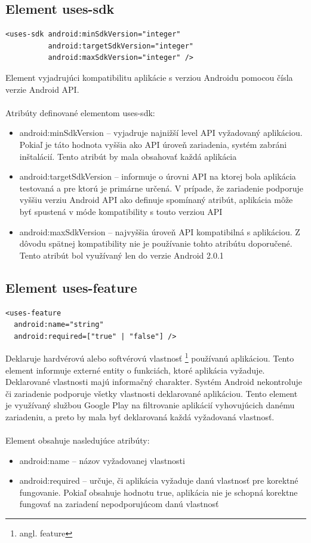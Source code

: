 \subsection{Element uses-sdk}
\lstset{language=XML}
\begin{lstlisting}
<uses-sdk android:minSdkVersion="integer"
          android:targetSdkVersion="integer"
          android:maxSdkVersion="integer" />
\end{lstlisting}
Element vyjadrujúci kompatibilitu aplikácie s verziou Androidu pomocou čísla verzie Android API.\\\\
Atribúty definované elementom uses-sdk:\\
\begin{itemize}
\item android:minSdkVersion – vyjadruje najnižší level API vyžadovaný aplikáciou. Pokiaľ je táto hodnota vyššia ako API úroveň zariadenia, systém zabráni inštalácií. Tento atribút by mala obsahovať každá aplikácia
\item android:targetSdkVersion – informuje o úrovni API na ktorej bola aplikácia testovaná a pre ktorú je primárne určená. V prípade, že zariadenie podporuje vyššiu verziu Android API ako definuje spomínaný atribút, aplikácia môže byť spustená v móde kompatibility s touto verziou API 
\item android:maxSdkVersion – najvyššia úroveň API kompatibilná s aplikáciou. Z dôvodu spätnej kompatibility nie je používanie tohto atribútu doporučené. Tento atribút bol využívaný len do verzie Android 2.0.1
\end{itemize}

\subsection{Element uses-feature}
\label{el_uses-feature}
\lstset{language=XML}
\begin{lstlisting}
<uses-feature
  android:name="string"
  android:required=["true" | "false"] />
\end{lstlisting}
Deklaruje hardvérovú alebo softvérovú vlastnosť \footnote{angl. feature} používanú aplikáciou. Tento element informuje externé entity o funkciách, ktoré aplikácia vyžaduje. Deklarované vlastnosti majú informačný charakter. Systém Android nekontroluje či zariadenie podporuje všetky vlastnosti deklarované aplikáciou. Tento element je využívaný službou Google Play na  filtrovanie aplikácií vyhovujúcich danému zariadeniu, a preto by mala byť deklarovaná každá vyžadovaná vlastnosť.\\\\ Element obsahuje nasledujúce atribúty:\\
\begin{itemize}
\item android:name – názov vyžadovanej vlastnosti
\item android:required – určuje, či aplikácia vyžaduje danú vlastnosť pre korektné fungovanie. Pokiaľ obsahuje hodnotu true, aplikácia nie je schopná korektne fungovať na zariadení nepodporujúcom danú vlastnosť
\end{itemize}

